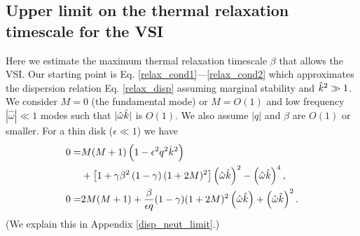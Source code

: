 
\subsection{Upper limit on the thermal relaxation timescale for the
  VSI}\label{iso_vsi_beta_crit}
Here we estimate the maximum thermal relaxation timescale 
$\beta$ that allows the VSI.  
Our starting point is Eq. \ref{relax_cond1}---\ref{relax_cond2} which
approximates the dispersion relation Eq. \ref{relax_disp} assuming marginal
stability and $\hat{k}^2\gg 1$. We consider $M=0$ (the 
fundamental mode) or  $M=O(1)$ and low frequency $|\hat{\omega}|\ll
1$ modes such that $|\hat{\omega}\hat{k}|$ is $O(1)$. We 
also assume $|q|$ and $\beta$ are $O(1)$ or smaller. For a thin disk
($\epsilon \ll 1$) we have 
\begin{align}
 0 = &M(M+1)\left(1-\epsilon^2q^2\hat{k}^2\right) \notag\\ 
 &+ \left[1 +
    \gamma\beta^2\left(1-\gamma\right)(1+2M)^2\right]\left(\hat{\omega}\hat{k}\right)^2
   -  \left(\hat{\omega}\hat{k}\right)^4,\label{relax_cond_simp1}\\
   0= &2M(M+1) + \frac{\beta}{\epsilon q} (1-\gamma)(1+2M)^2
   \left(\hat{\omega}\hat{k}\right) + \left(\hat{\omega}\hat{k}\right)^2. \label{relax_cond_simp2}
\end{align}
(We explain this in Appendix \ref{disp_neut_limit}.)

